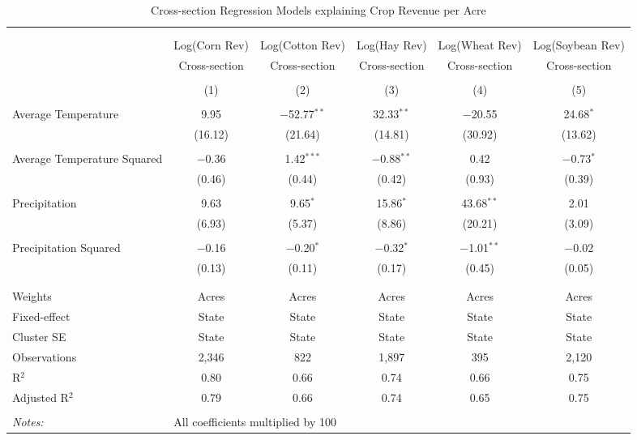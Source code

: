 \documentclass[10pt]{article}
\begin{document}
\begin{table}[!htbp] \centering 
  \caption{Cross-section Regression Models explaining Crop Revenue per Acre} 
  \label{} 
\footnotesize 
\begin{tabular}{@{\extracolsep{5pt}}lccccc} 
\\[-1.8ex]\hline 
\hline \\[-1.8ex] 
\\[-1.8ex] & Log(Corn Rev) & Log(Cotton Rev) & Log(Hay Rev) & Log(Wheat Rev) & Log(Soybean Rev) \\ 
 & Cross-section & Cross-section & Cross-section & Cross-section & Cross-section \\ 
\\[-1.8ex] & (1) & (2) & (3) & (4) & (5)\\ 
\hline \\[-1.8ex] 
 Average Temperature & 9.95 & $-$52.77$^{**}$ & 32.33$^{**}$ & $-$20.55 & 24.68$^{*}$ \\ 
  & (16.12) & (21.64) & (14.81) & (30.92) & (13.62) \\ 
  & & & & & \\ 
 Average Temperature Squared & $-$0.36 & 1.42$^{***}$ & $-$0.88$^{**}$ & 0.42 & $-$0.73$^{*}$ \\ 
  & (0.46) & (0.44) & (0.42) & (0.93) & (0.39) \\ 
  & & & & & \\ 
 Precipitation & 9.63 & 9.65$^{*}$ & 15.86$^{*}$ & 43.68$^{**}$ & 2.01 \\ 
  & (6.93) & (5.37) & (8.86) & (20.21) & (3.09) \\ 
  & & & & & \\ 
 Precipitation Squared & $-$0.16 & $-$0.20$^{*}$ & $-$0.32$^{*}$ & $-$1.01$^{**}$ & $-$0.02 \\ 
  & (0.13) & (0.11) & (0.17) & (0.45) & (0.05) \\ 
  & & & & & \\ 
\hline \\[-1.8ex] 
Weights & Acres & Acres & Acres & Acres & Acres \\ 
Fixed-effect & State & State & State & State & State \\ 
Cluster SE & State & State & State & State & State \\ 
Observations & 2,346 & 822 & 1,897 & 395 & 2,120 \\ 
R$^{2}$ & 0.80 & 0.66 & 0.74 & 0.66 & 0.75 \\ 
Adjusted R$^{2}$ & 0.79 & 0.66 & 0.74 & 0.65 & 0.75 \\ 
\hline 
\hline \\[-1.8ex] 
\textit{Notes:} & \multicolumn{5}{l}{All coefficients multiplied by 100} \\ 
\end{tabular} 
\end{table} 
\end{document}
